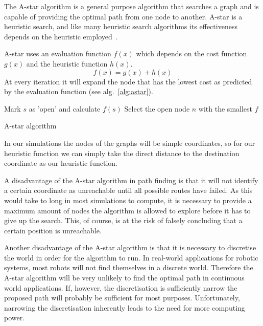 			The A-star algorithm is a general purpose algorithm that searches a graph and is capable of providing the optimal path from one node to another. A-star is a heuristic search, and like many heuristic search algorithms its effectiveness depends on the heuristic employed~\cite{4082128}.

			A-star uses an evaluation function $f(x)$ which depends on the cost function $g(x)$ and the heuristic function $h(x)$.
			\begin{equation}
				\label{eq:astarevaluation}
			 	f(x) = g(x) + h(x)
			\end{equation} 
			At every iteration it will expand the node that has the lowest cost as predicted by the evaluation function (see alg.~\ref{alg:astar}).

			\begin{algorithm}
				Mark $s$ as 'open' and calculate $f(s)$\;
				Select the open node $n$ with the smallest $f$\;
				\caption{A-star algorithm~\protect\cite{4082128}}
				\label{alg:astar}
			\end{algorithm}

			In our simulations the nodes of the graphs will be simple coordinates, so for our heuristic function we can simply take the direct distance to the destination coordinate as our heuristic function.

			A disadvantage of the A-star algorithm in path finding is that it will not identify a certain coordinate as unreachable until all possible routes have failed. As this would take to long in most simulations to compute, it is necessary to provide a maximum amount of nodes the algorithm is allowed to explore before it has to give up the search. This, of course, is at the risk of falsely concluding that a certain position is unreachable.

			Another disadvantage of the A-star algorithm is that it is necessary to discretise the world in order for the algorithm to run. In real-world applications for robotic systems, most robots will not find themselves in a discrete world. Therefore the A-star algorithm will be very unlikely to find the optimal path in continuous world applications. If, however, the discretisation is sufficiently narrow the proposed path will probably be sufficient for most purposes. Unfortunately, narrowing the discretisation inherently leads to the need for more computing power.


